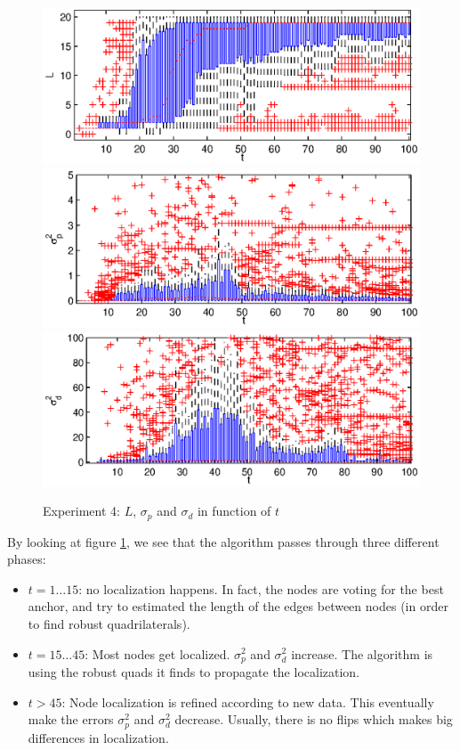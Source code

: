 \documentclass[letterpaper, 10 pt, conference]{ieeeconf}  %
\begin{document}
\begin{figure}[ht!]
\centering
\includegraphics[width=1\columnwidth]{set4-L-nosrf.eps}
\includegraphics[width=1\columnwidth]{set4-sp-nosrf.eps}
\includegraphics[width=1\columnwidth]{set4-sd-nosrf.eps}
\caption{\label{figure:set4}Experiment 4: $L$, $\sigma_p$ and $\sigma_d$ in function of $t$}
\end{figure}

By looking at figure \ref{figure:set4}, we see that the algorithm passes through three different phases:
\begin{itemize}
    \item $t=1 \ldots 15$: no localization happens. In fact, the nodes are voting for the best anchor, and try to estimated the length of the edges between nodes (in order to find robust quadrilaterals).
    \item $t=15 \ldots 45$: Most nodes get localized. $\sigma_p^2$ and $\sigma_d^2$ increase. The algorithm is using the robust quads it finds to propagate the localization.
    \item $t>45$: Node localization is refined according to new data. This eventually make the errors $\sigma_p^2$ and $\sigma_d^2$ decrease. Usually, there is no flips which makes big differences in localization.
\end{itemize}
\end{document}
